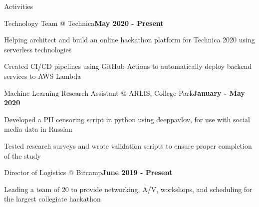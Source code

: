 \documentclass[mm,centered]{resume} %
\begin{document}
\begin{rSection}{Activities} 
	
	\begin{rSubsection}{Technology Team @ Technica}{\textbf{May 2020 - Present}}{}{}
		\item Helping architect and build an online hackathon platform for Technica 2020 using serverless technologies
		\item Created CI/CD pipelines using GitHub Actions to automatically deploy backend services to AWS Lambda
	\end{rSubsection}
	
	\begin{rSubsection}{Machine Learning Research Assistant @ ARLIS, College Park}{\textbf{January - May 2020}}{}{}
		\item Developed a PII censoring script in python using deeppavlov, for use with social media data in Russian
		\item Tested research surveys and wrote validation scripts to ensure proper completion of the study
	\end{rSubsection}
	
	\begin{rSubsection}{Director of Logistics @ Bitcamp}{\textbf{June 2019 - Present}}{}{}
		\item Leading a team of 20 to provide networking, A/V, workshops, and scheduling for the largest collegiate hackathon
	\end{rSubsection}
	
\end{rSection}
\end{document}
